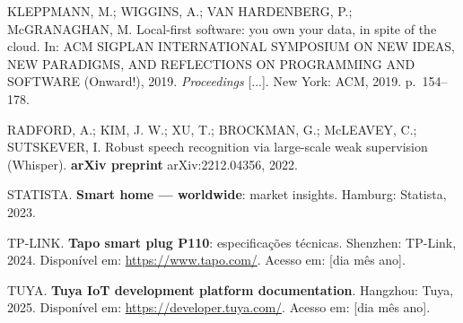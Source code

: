 KLEPPMANN, M.; WIGGINS, A.; VAN HARDENBERG, P.; McGRANAGHAN, M. Local-first software:
you own your data, in spite of the cloud. In: ACM SIGPLAN INTERNATIONAL SYMPOSIUM ON
NEW IDEAS, NEW PARADIGMS, AND REFLECTIONS ON PROGRAMMING AND SOFTWARE (Onward!), 2019.
\textit{Proceedings} [...]. New York: ACM, 2019. p.~154--178.

RADFORD, A.; KIM, J. W.; XU, T.; BROCKMAN, G.; McLEAVEY, C.; SUTSKEVER, I. Robust
speech recognition via large-scale weak supervision (Whisper). \textbf{arXiv preprint}
arXiv:2212.04356, 2022.

STATISTA. \textbf{Smart home --- worldwide}: market insights. Hamburg: Statista, 2023.

TP-LINK. \textbf{Tapo smart plug P110}: especificações técnicas. Shenzhen: TP-Link,
2024. Disponível em: \url{https://www.tapo.com/}. Acesso em: [dia mês ano].

TUYA. \textbf{Tuya IoT development platform documentation}. Hangzhou: Tuya, 2025.
Disponível em: \url{https://developer.tuya.com/}. Acesso em: [dia mês ano].

\endgroup
